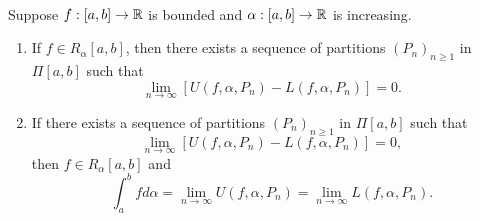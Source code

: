 \begin{theorem} \leavevmode \\
    Suppose $f:[a,b] \to \mathbb{R}$ is bounded and $\alpha:[a,b] \to \mathbb{R}$ is increasing.
    \begin{enumerate}
        \item If $f \in R_\alpha[a,b]$, then there exists a sequence of partitions $(P_n)_{n \geq 1}$ in $\Pi[a,b]$ such that
        $$\lim_{n \to \infty} \left[U(f,\alpha, P_n) - L(f, \alpha, P_n)\right] = 0.$$
        \item If there exists a sequence of partitions $(P_n)_{n \geq 1}$ in $\Pi[a,b]$ such that 
        $$\lim_{n\to \infty} \left[U(f,\alpha, P_n) - L(f,\alpha, P_n)\right] = 0,$$
        then $f \in R_\alpha [a,b]$ and 
        $$\int_a^b f d \alpha = \lim_{n\to \infty} U(f, \alpha, P_n) = \lim_{n \to \infty} L(f, \alpha, P_n).$$
    \end{enumerate}
\end{theorem}
    
